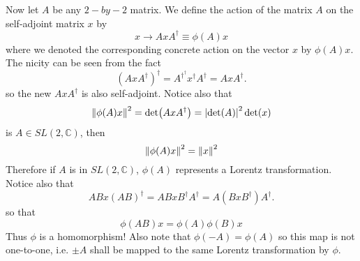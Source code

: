 \documentclass[11pt]{article}
\theoremstyle{remark}
\theoremstyle{definition}
\numberwithin{thm}{section}
\begin{document}
Now let  $A$ be any $2-by-2$ matrix. We define the action of the matrix $A$ on the self-adjoint matrix $x$ by
\[
	x \rightarrow A x A^\dagger \equiv \phi(A)x
\] 
where we denoted the corresponding concrete action on the vector $x$ by $\phi(A) x$. The nicity can be seen from the fact
\[
\left( A x A^\dagger \right)^\dagger = A^\dagger^\dagger x^\dagger A^\dagger = A x A^\dagger
.\] 
so the new $AxA^\dagger$ is also self-adjoint. Notice also that
\begin{equation}
	\norm{\phi(A)x}^2 = \det(AxA^\dagger) = \abs{\det(A)}^2 \det(x)
\end{equation}
is $A \in SL(2,\mathbb{C})$, then
\begin{equation}
	\norm{\phi(A)x}^2 = \norm{x}^2
\end{equation}
Therefore if $A$ is in $SL(2,\mathbb{C})$, $\phi(A)$ represents a Lorentz transformation. Notice also that
\[
	ABx(AB)^\dagger = ABx B^\dagger A^\dagger = A(BxB^\dagger)A^\dagger
.\] 
so that
\begin{equation}
	\phi(AB)x = \phi(A)\phi(B)x
\end{equation}
Thus $\phi$ is a homomorphism! Also note that $\phi(-A) = \phi(A)$ so this map is not one-to-one, i.e. $\pm A$ shall be mapped to the same Lorentz transformation by  $\phi$.


%
\end{document}
